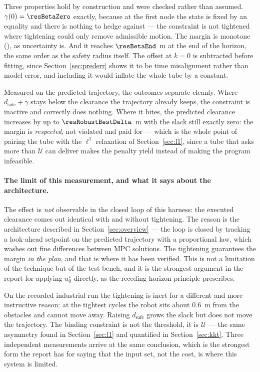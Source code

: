 \documentclass[11pt,a4paper]{article}
\newcommand{\dsafe}{d_{\mathrm{safe}}}
\begin{document}
Three properties hold by construction and were checked rather than assumed. $\gamma(0)=\resBetaZero$ exactly,
because at the first node the state is fixed by an equality and there is nothing to hedge against --- the
constraint is not tightened where tightening could only remove admissible motion. The margin is monotone
(\resBetaMonotone), as uncertainty is. And it reaches $\resBetaEnd$~m at the end of the horizon, the same
order as the safety radius itself. The offset at $k=0$ is subtracted before fitting, since
Section~\ref{sec:prederr} shows it to be time misalignment rather than model error, and including it would
inflate the whole tube by a constant.

\begin{table}[htbp]
  \centering
  \small
  \caption{Effect of the tightening on the predicted trajectory.}
  \label{res:tab:robust}
\end{table}

Measured on the predicted trajectory, the outcomes separate cleanly. Where $\dsafe+\gamma$ stays below the
clearance the trajectory already keeps, the constraint is inactive and correctly does nothing. Where it
bites, the predicted clearance increases by up to $\resRobustBestDelta$~m with the slack still exactly zero:
the margin is \emph{respected}, not violated and paid for --- which is the whole point of pairing the tube
with the $\ell^1$ relaxation of Section~\ref{sec:l1}, since a tube that asks more than $\mathcal{U}$ can
deliver makes the penalty yield instead of making the program infeasible.

\paragraph{The limit of this measurement, and what it says about the architecture.} The effect is
\emph{not} observable in the closed loop of this harness: the executed clearance comes out identical with and
without tightening. The reason is the architecture described in Section~\ref{sec:overview} --- the loop is
closed by tracking a look-ahead setpoint on the predicted trajectory with a proportional law, which washes
out fine differences between MPC solutions. The tightening guarantees the margin \emph{in the plan}, and that
is where it has been verified. This is not a limitation of the technique but of the test bench, and it is the
strongest argument in the report for applying $u^\star_0$ directly, as the receding-horizon principle
prescribes.

On the recorded industrial run the tightening is inert for a different and more instructive reason: at the
tightest cycles the robot sits about $0.6$~m from the obstacles and cannot move away. Raising $\dsafe$ grows
the slack but does not move the trajectory. The binding constraint is not the threshold, it is
$\mathcal{U}$ --- the same asymmetry found in Section~\ref{sec:l1} and quantified in Section~\ref{sec:kkt}.
Three independent measurements arrive at the same conclusion, which is the strongest form the report has for
saying that the input set, not the cost, is where this system is limited.
\end{document}
